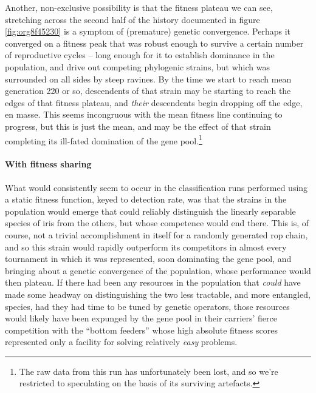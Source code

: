 \documentclass[12pt,glossary]{dalthesis}
\begin{document}
Another, non-exclusive possibility is that the fitness plateau we can see,
stretching across the second half of the history documented in figure
\ref{fig:org8f45230} is a symptom of (premature) genetic convergence. 
Perhaps it converged on a fitness peak that was robust enough to survive
a certain number of reproductive cycles -- long enough for it to establish
dominance in the population, and drive out competing phylogenic strains, but 
which was surrounded on all sides by steep ravines. By the time we start to reach
mean generation 220 or so, descendents of that strain may be starting to reach
the edges of that fitness plateau, and \emph{their} descendents begin dropping off the
edge, en masse. This seems incongruous with the mean fitness line continuing to
progress, but this is just the mean, and may be the effect of that strain completing
its ill-fated domination of the gene pool.\footnote{The raw data from this run has unfortunately been lost, and so we're restricted
  to speculating on the basis of its surviving artefacts.}

\paragraph{With fitness sharing}
\label{sec:org77b59b1}
\label{org3aa9c10}

 What would consistently seem to occur in the classification runs performed
 using a static fitness function, keyed to detection rate, was that the
 strains in the population would emerge that could reliably distinguish the
 linearly separable species of iris from the others, but whose competence
 would end there. This is, of course, not a trivial accomplishment in itself
 for a randomly generated \gls{rop} chain, and so this strain would rapidly
 outperform its competitors in almost every tournament in which it was
 represented, soon dominating the gene pool, and bringing about a genetic
 convergence of the population, whose performance would then plateau. If there
 had been any resources in the population that \emph{could} have made some headway
 on distinguishing the two less tractable, and more entangled, species, had
they had time to be tuned by genetic operators, those resources would likely
have been expunged by the gene pool in their carriers' fierce competition with
the ``bottom feeders'' whose high absolute fitness scores represented only a
facility for solving relatively \emph{easy} problems.
\end{document}
